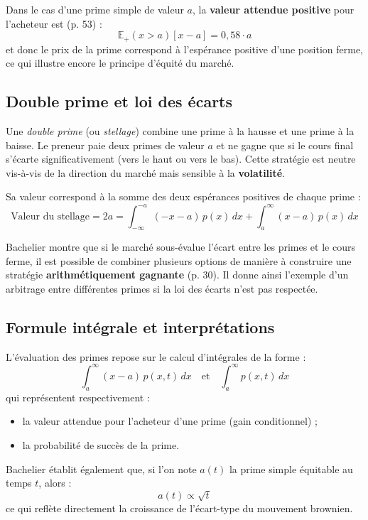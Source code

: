 \documentclass[12pt,a4paper]{article}
\begin{document}
Dans le cas d’une prime simple de valeur $a$, la \textbf{valeur attendue positive} pour l’acheteur est (p. 53) :
\[
\mathbb{E}_+(x > a)[x - a] = 0{,}58 \cdot a
\]
et donc le prix de la prime correspond à l’espérance positive d’une position ferme, ce qui illustre encore le principe d’équité du marché.

\subsection{Double prime et loi des écarts}

Une \textit{double prime} (ou \textit{stellage}) combine une prime à la hausse et une prime à la baisse. Le preneur paie deux primes de valeur $a$ et ne gagne que si le cours final s’écarte significativement (vers le haut ou vers le bas). Cette stratégie est neutre vis-à-vis de la direction du marché mais sensible à la \textbf{volatilité}.

Sa valeur correspond à la somme des deux espérances positives de chaque prime :
\[
\text{Valeur du stellage} = 2a = \int_{-\infty}^{-a} (-x - a)\, p(x)\, dx + \int_a^{\infty} (x - a)\, p(x)\, dx
\]

Bachelier montre que si le marché sous-évalue l’écart entre les primes et le cours ferme, il est possible de combiner plusieurs options de manière à construire une stratégie \textbf{arithmétiquement gagnante} (p. 30). Il donne ainsi l’exemple d’un arbitrage entre différentes primes si la loi des écarts n’est pas respectée.

\subsection{Formule intégrale et interprétations}

L’évaluation des primes repose sur le calcul d’intégrales de la forme :
\[
\int_a^{\infty} (x - a)\, p(x,t)\, dx
\quad \text{et} \quad
\int_a^{\infty} p(x,t)\, dx
\]
qui représentent respectivement :
\begin{itemize}
    \item la valeur attendue pour l’acheteur d’une prime (gain conditionnel) ;
    \item la probabilité de succès de la prime.
\end{itemize}

Bachelier établit également que, si l’on note $a(t)$ la prime simple équitable au temps $t$, alors :
\[
a(t) \propto \sqrt{t}
\]
ce qui reflète directement la croissance de l’écart-type du mouvement brownien.
\end{document}
